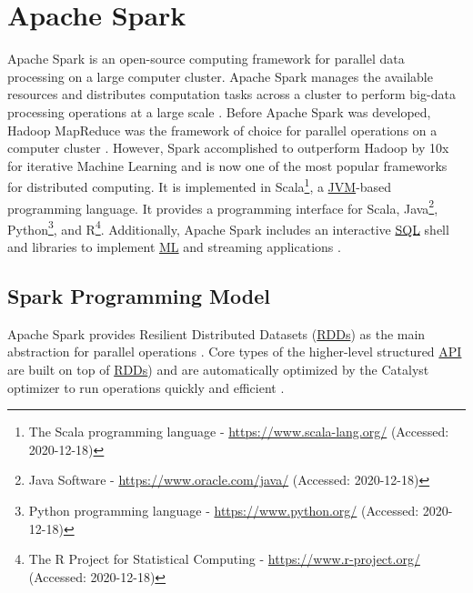 \section{Apache Spark}
\label{sec:04_spark}
Apache Spark is an open-source computing framework for parallel data processing on a large computer cluster. Apache Spark manages the available resources and distributes computation tasks across a cluster to perform big-data processing operations at a large scale \cite{Chambers2018Spark}. Before Apache Spark was developed, Hadoop MapReduce \cite{Dean2010MapReduce} was the framework of choice for parallel operations on a computer cluster \cite{Zaharia2010Spark}. However, Spark accomplished to outperform Hadoop by 10x for iterative Machine Learning \cite{Zaharia2010Spark} and is now one of the most popular frameworks for distributed computing. It is implemented in Scala\footnote{The Scala programming language - \url{https://www.scala-lang.org/} (Accessed: 2020-12-18)}, a \hyperlink{abbr:jvm}{JVM}-based programming language. It provides a programming interface for Scala, Java\footnote{Java Software - \url{https://www.oracle.com/java/} (Accessed: 2020-12-18)}, Python\footnote{Python programming language - \url{https://www.python.org/} (Accessed: 2020-12-18)}, and R\footnote{The R Project for Statistical Computing - \url{https://www.r-project.org/} (Accessed: 2020-12-18)}. Additionally, Apache Spark includes an interactive \hyperlink{abbr:sql}{SQL} shell and libraries to implement \hyperlink{abbr:ml}{ML} and streaming applications \cite{Chambers2018Spark}.


\subsection{Spark Programming Model}
\label{subsec:04_spark_pr-model}
Apache Spark provides Resilient Distributed Datasets (\hyperlink{abbr:rdd}{RDDs}) as the main abstraction for parallel operations \cite{Zaharia2010Spark}. Core types of the higher-level structured \hyperlink{abbr:api}{API} are built on top of \hyperlink{abbr:rdd}{RDDs}) and are automatically optimized by the Catalyst optimizer to run operations quickly and efficient \cite{Chambers2018Spark, Hien2018Spark}.



